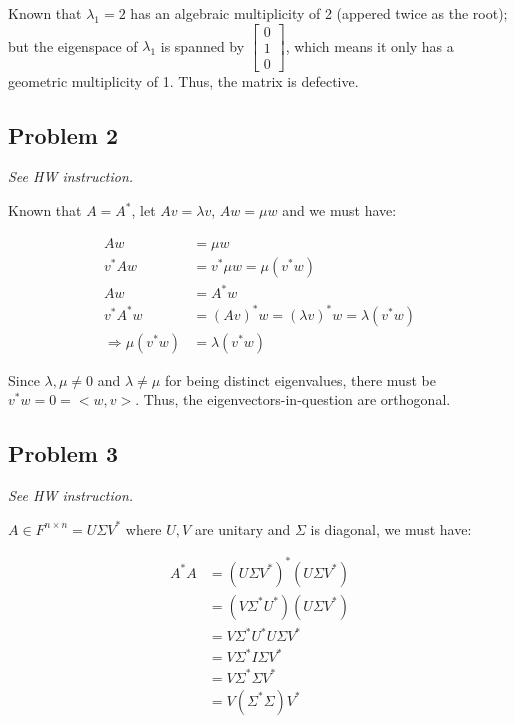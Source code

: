\documentclass[11pt]{article}
\providecommand{\qbm}[1]{\begin{bmatrix} #1 \end{bmatrix}}
\begin{document}
Known that $\lambda_1 = 2$ has an algebraic multiplicity of 2 (appered twice as the root); but the eigenspace of $\lambda_1$ is spanned by $ \qbm{0 \\ 1 \\ 0}$, which means it only has a geometric multiplicity of 1. Thus, the matrix is defective.

\subsection*{Problem 2}
\textit{See HW instruction.}\newline

Known that $A = A^*$, let $Av = \lambda v$, $Aw = \mu w$ and we must have:

\begin{align*}
    Aw &= \mu w \\
    v^* Aw &= v^* \mu w = \mu (v^* w) \\
    Aw &= A^*w \\
    v^* A^* w  &= (Av)^* w = (\lambda v)^* w = \lambda (v^* w) \\
    \Longrightarrow \mu (v^* w) &= \lambda (v^* w)
\end{align*}

Since $\lambda, \mu \neq 0$ and $\lambda \neq \mu$ for being distinct eigenvalues, there must be $v^*w = 0 = <w, v>$. Thus, the eigenvectors-in-question are orthogonal.


\subsection*{Problem 3}
\textit{See HW instruction.}\newline

$A\in F^{n \times n} = U\Sigma V^{*}$ where $U, V$ are unitary and $\Sigma$ is diagonal, we must have:

\begin{align*}
    A^{*}A &=(U \Sigma V^{*})^{*}(U \Sigma V^{*}) \\
    &=(V \Sigma^{*} U^{*})(U \Sigma V^{*}) \\
    &= V \Sigma^{*} U^{*}U \Sigma V^{*} \\
    &= V \Sigma^{*} I \Sigma V^{*} \\
    &= V \Sigma^{*} \Sigma V^{*} \\
    &= V (\Sigma^{*} \Sigma) V^{*}
\end{align*}
\end{document}
